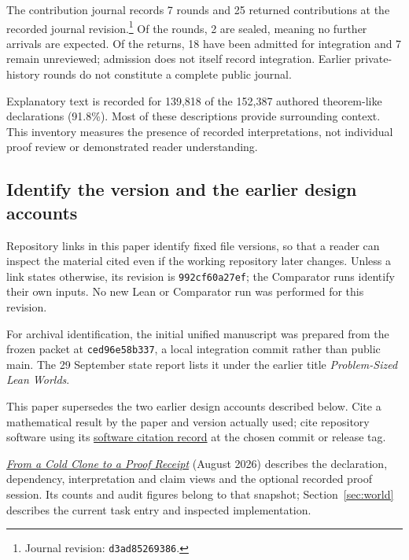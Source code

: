 \documentclass[10pt]{article}
\newcommand{\repobase}{https://github.com/wcook04/plectis-erdos}
\newcommand{\reporef}[2]{\href{\repobase/blob/992cf60a27efd8c34f437e347c413bb781d75c32/#1}{#2}}
\newcommand{\JournalHead}{d3ad85269386}
\newcommand{\Rounds}{7}
\newcommand{\RoundsSealed}{2}
\newcommand{\Returns}{25}
\newcommand{\ReturnsAdmitted}{18}
\newcommand{\ReturnsUnreviewed}{7}
\newcommand{\SemanticAuthoredTheoremLike}{152,387}
\newcommand{\SemanticAuthoredInterpreted}{139,818}
\newcommand{\SemanticAuthoredPercent}{91.8}
\begin{document}
The contribution journal records \Rounds{} rounds and \Returns{} returned contributions at the recorded journal revision.\footnote{Journal revision: \texttt{\JournalHead}.} Of the rounds, \RoundsSealed{} are sealed, meaning no further arrivals are expected. Of the returns, \ReturnsAdmitted{} have been admitted for integration and \ReturnsUnreviewed{} remain unreviewed; admission does not itself record integration. Earlier private-history rounds do not constitute a complete public journal.

Explanatory text is recorded for \SemanticAuthoredInterpreted{} of the \SemanticAuthoredTheoremLike{} authored theorem-like declarations (\SemanticAuthoredPercent\%). Most of these descriptions provide surrounding context. This inventory measures the presence of recorded interpretations, not individual proof review or demonstrated reader understanding.

\subsection{Identify the version and the earlier design accounts}

Repository links in this paper identify fixed file versions, so that a reader can inspect the material cited even if the working repository later changes. Unless a link states otherwise, its revision is \texttt{992cf60a27ef}; the Comparator runs identify their own inputs. No new Lean or Comparator run was performed for this revision.

For archival identification, the initial unified manuscript was prepared from the frozen packet at \texttt{ced96e58b337}, a local integration commit rather than public main. The 29 September state report lists it under the earlier title \emph{Problem-Sized Lean Worlds}.

This paper supersedes the two earlier design accounts described below. Cite a mathematical result by the paper and version actually used; cite repository software using its \reporef{CITATION.cff}{software citation record} at the chosen commit or release tag.

\emph{\reporef{paper/systems/cold-clone-to-proof-receipt.tex}{From a Cold Clone to a Proof Receipt}} (August 2026) describes the declaration, dependency, interpretation and claim views and the optional recorded proof session. Its counts and audit figures belong to that snapshot; Section~\ref{sec:world} describes the current task entry and inspected implementation.
\end{document}
